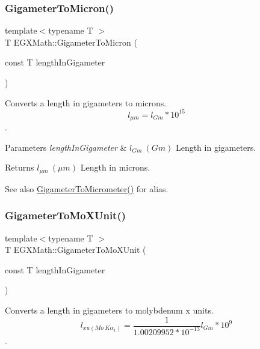 \subsubsection{\texorpdfstring{Gigameter\+To\+Micron()}{GigameterToMicron()}}
{\footnotesize\ttfamily template$<$typename T $>$ \\
T E\+G\+X\+Math\+::\+Gigameter\+To\+Micron (\begin{DoxyParamCaption}\item[{const T}]{length\+In\+Gigameter }\end{DoxyParamCaption})}



Converts a length in gigameters to microns. \[ l_{\mu m}=l_{Gm} * 10^{15} \]. 


\begin{DoxyParams}{Parameters}
{\em length\+In\+Gigameter} & $ l_{Gm}\ (Gm)$ Length in gigameters. \\
\hline
\end{DoxyParams}
\begin{DoxyReturn}{Returns}
$ l_{\mu m}\ (\mu m)$ Length in microns. 
\end{DoxyReturn}
\begin{DoxySeeAlso}{See also}
\mbox{\hyperlink{group___e_g_x_math-_conversions-_length_conversions-_gigameter-_s_i_ga02f73d15581b1cd69a79b843186211f5}{Gigameter\+To\+Micrometer()}} for alias. 
\end{DoxySeeAlso}
\mbox{\label{group___e_g_x_math-_conversions-_length_conversions-_gigameter-_non-_s_i_gac30ae06633de77b05d859ffb3cd2a577}} 
\subsubsection{\texorpdfstring{Gigameter\+To\+Mo\+X\+Unit()}{GigameterToMoXUnit()}}
{\footnotesize\ttfamily template$<$typename T $>$ \\
T E\+G\+X\+Math\+::\+Gigameter\+To\+Mo\+X\+Unit (\begin{DoxyParamCaption}\item[{const T}]{length\+In\+Gigameter }\end{DoxyParamCaption})}



Converts a length in gigameters to molybdenum x units. \[ l_{xu(Mo\ K\alpha_1)}=\frac{1}{1.00209952*10^{-13}} l_{Gm} * 10^{9}\]. 



